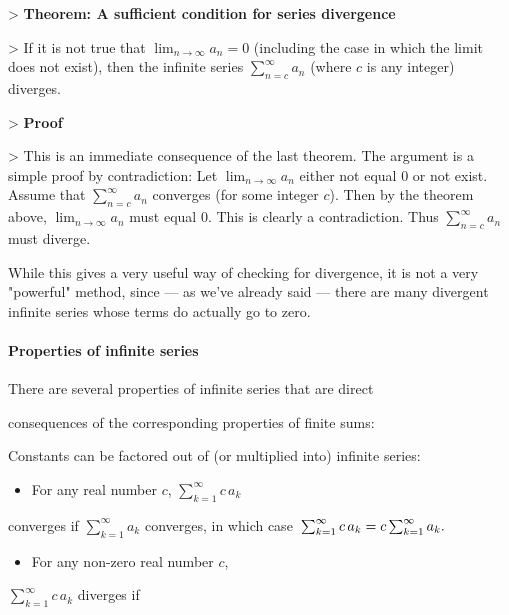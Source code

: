 > \textbf{Theorem: A sufficient condition for series divergence}

> If it is not true that $\lim _{n\to\infty} a _n = 0$ (including the case in which the limit does not exist), then the infinite series $\sum _{n=c}^\infty a _n$ (where $c$ is any integer) diverges.

> \textbf{Proof}

> This is an immediate consequence of the last theorem. The argument is a simple proof by contradiction: Let $\lim _{n\to\infty} a _n$ either not equal 0 or not exist. Assume that $\sum _{n=c}^\infty a _n$ converges (for some integer $c$). Then by the theorem above, $\lim _{n\to\infty} a _n$ must equal 0. This is clearly a contradiction. Thus $\sum _{n=c}^\infty a _n$ must diverge.



While this gives a very useful way of checking for divergence, it is not a very "powerful" method, since --- as we've already said --- there are many divergent infinite series whose terms do actually go to zero.



\paragraph{Properties of infinite series}



There are several properties of infinite series that are direct

consequences of the corresponding properties of finite sums:



Constants can be factored out of (or multiplied into) infinite series:



\begin{itemize}
    \item For any real number $c$, $\textstyle \sum _{k=1}^{\infty} c\,a _k$
\end{itemize}
    converges if $\textstyle \sum _{k=1}^{\infty} a _k$ converges, in which case $\newline \textstyle \sum _{k=1}^{\infty} c\,a _k = c\sum _{k=1}^{\infty}a _k.\newline$

\begin{itemize}
    \item For any non-zero real number $c$,
\end{itemize}
    $\textstyle \sum _{k=1}^{\infty} c\,a _k$ diverges if

